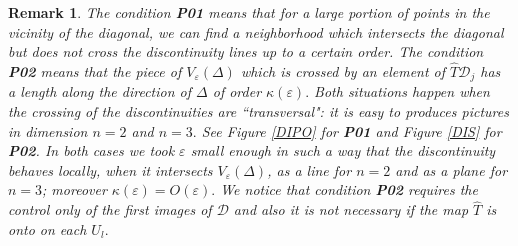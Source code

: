 \documentclass[12pt,reqno,a4paper]{amsart}
\newtheorem{rmk}[thm]{Remark}
\begin{document}
\begin{rmk}

 The condition {\bf P01} means that for a large portion of points in the vicinity  of the diagonal, we can find a neighborhood which intersects the diagonal but does not cross the discontinuity lines up to a certain order. The condition {\bf P02} means that the piece of $V_{\varepsilon}(\Delta)$ which is crossed by an element of $\hat{T}{\mathcal D}_j$ has a  length along the direction of $\Delta$ of order $\kappa(\varepsilon).$
Both situations happen when the crossing of the discontinuities are ``transversal": it is easy to produces pictures in dimension $n=2$ and $n=3.$ See Figure \ref{DIPO} for {\bf P01} and Figure \ref{DIS} for {\bf P02}. In both cases we took $\varepsilon$ small enough in such a way that the discontinuity behaves locally, when it intersects $V_{\varepsilon}(\Delta)$, as a line for $n=2$ and as a plane for $n=3$; moreover $\kappa(\varepsilon)=O(\varepsilon).$
We notice that condition  {\bf P02} requires the control only  of the first images of $\mathcal{D}$ and also it is not necessary if the map $\hat{T}$ is onto on each $U_l.$
\end{rmk}
\end{document}
